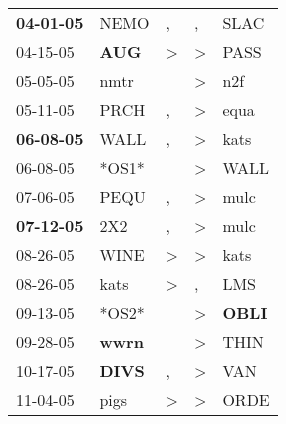 \begin{supertabular}{p{0.07\textwidth}p{0.06\textwidth}p{0.02\textwidth}p{0.02\textwidth}p{0.06\textwidth}}
 \textbf{04-01-05\textsuperscript{}} &           NEMO\textsuperscript{} &                , &                , &           SLAC\textsuperscript{} \\
          04-15-05\textsuperscript{} &   \textbf{AUG\textsuperscript{}} &     \textgreater &     \textgreater &           PASS\textsuperscript{} \\
          05-05-05\textsuperscript{} &           nmtr\textsuperscript{} &                  &     \textgreater &            n2f\textsuperscript{} \\
          05-11-05\textsuperscript{} &           PRCH\textsuperscript{} &                , &     \textgreater &           equa\textsuperscript{} \\
 \textbf{06-08-05\textsuperscript{}} &           WALL\textsuperscript{} &                , &     \textgreater &           kats\textsuperscript{} \\
          06-08-05\textsuperscript{} &                            *OS1* &                  &     \textgreater &           WALL\textsuperscript{} \\
          07-06-05\textsuperscript{} &           PEQU\textsuperscript{} &                , &     \textgreater &           mulc\textsuperscript{} \\
 \textbf{07-12-05\textsuperscript{}} &            2X2\textsuperscript{} &                , &     \textgreater &           mulc\textsuperscript{} \\
          08-26-05\textsuperscript{} &           WINE\textsuperscript{} &     \textgreater &     \textgreater &           kats\textsuperscript{} \\
          08-26-05\textsuperscript{} &           kats\textsuperscript{} &     \textgreater &                , &            LMS\textsuperscript{} \\
          09-13-05\textsuperscript{} &                            *OS2* &                  &     \textgreater &  \textbf{OBLI\textsuperscript{}} \\
          09-28-05\textsuperscript{} &  \textbf{wwrn\textsuperscript{}} &                  &     \textgreater &           THIN\textsuperscript{} \\
          10-17-05\textsuperscript{} &  \textbf{DIVS\textsuperscript{}} &                , &     \textgreater &            VAN\textsuperscript{} \\
          11-04-05\textsuperscript{} &           pigs\textsuperscript{} &     \textgreater &     \textgreater &           ORDE\textsuperscript{} \\

\end{supertabular}
